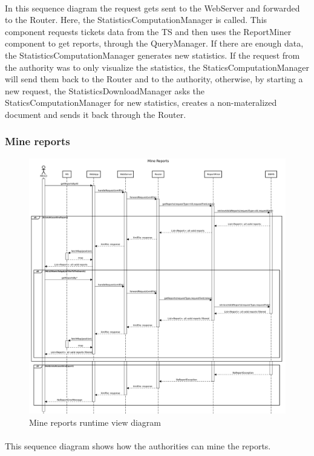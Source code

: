 					\paragraph{}
						In this sequence diagram the request gets sent to the WebServer and forwarded to the Router. Here, the StatisticsComputationManager is called. This component requests tickets data from the TS and then uses the ReportMiner component to get reports, through the QueryManager. If there are enough data, the StatisticsComputationManager generates new statistics. If the request from the authority was to only visualize the statistics, the StaticsComputationManager will send them back to the Router and to the authority, otherwise, by starting a new request, the StatisticsDownloadManager asks the StaticsComputationManager for new statistics, creates a non{-}materalized document and sends it back through the Router.
				\clearpage
				\subsubsection{Mine reports}
					\begin{figure}[!h]
						\centering
						\includegraphics[width=\textwidth]{images/DD2/RuntimeView/Authority/MineReports.pdf}
						\caption{Mine reports runtime view diagram}
					\end{figure}
					\paragraph{}
						This sequence diagram shows how the authorities can mine the reports. 
						

